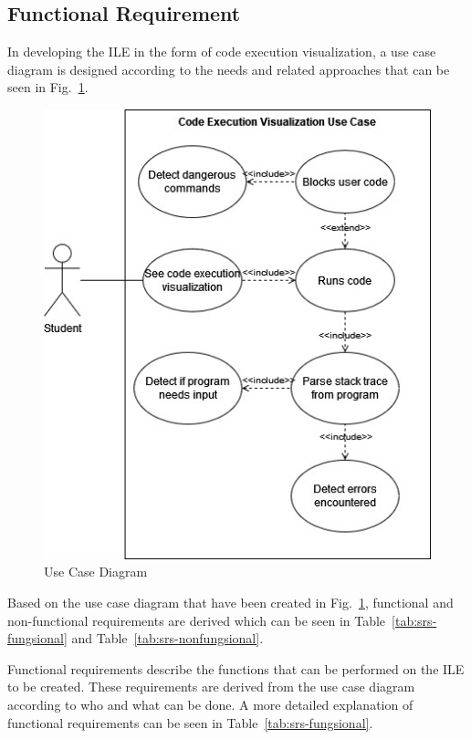 \documentclass[conference]{IEEEtran}
\begin{document}
\subsection{Functional Requirement}
In developing the ILE in the form of code execution visualization, a use case diagram is designed according to the needs and related approaches that can be seen in Fig.~\ref{fig:diagram-usecase-paper}.

\begin{figure}[htbp]
  \centerline{\includegraphics[width=0.7\linewidth]{chapter3/diagram_usecase_paper.jpg}}
  \caption{\label{fig:diagram-usecase-paper}Use Case Diagram}
\end{figure}

Based on the use case diagram that have been created in Fig.~\ref{fig:diagram-usecase-paper}, functional and non-functional requirements are derived which can be seen in Table~\ref{tab:srs-fungsional} and Table~\ref{tab:srs-nonfungsional}.

Functional requirements describe the functions that can be performed on the ILE to be created. These requirements are derived from the use case diagram according to who and what can be done. A more detailed explanation of functional requirements can be seen in Table~\ref{tab:srs-fungsional}.
\end{document}
